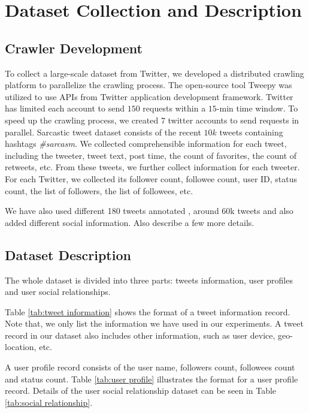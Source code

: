\section{Dataset Collection and Description}
\label{sec:dataset}
\subsection{Crawler Development}
To collect a large-scale dataset from Twitter, we developed a distributed crawling platform to parallelize the crawling process. The open-source tool Tweepy was utilized to use APIs from Twitter application development framework. Twitter has limited each account to send $150$ requests within a $15$-min time window. To speed up the crawling process, we created $7$ twitter accounts to send requests in parallel. Sarcastic tweet dataset consists of the recent $10k$ tweets containing hashtags \emph{\#sarcasm}. We collected comprehensible information for each tweet, including the tweeter, tweet text, post time, the count of favorites, the count of retweets, etc. From these tweets, we further collect information for each tweeter. For each Twitter, we collected its follower count, followee count, user ID, status count, the list of followers, the list of followees, etc.

We have also used different 180 tweets annotated \cite{davidov10}, around 60k tweets \cite{tomas14} and also added different social information. Also describe a few more details.\\

\subsection{Dataset Description}
The whole dataset is divided into three parts: tweets information, user profiles and user social relationships.

Table \ref{tab:tweet information} shows the format of a tweet information record. Note that, we only list the information we have used in our experiments. A tweet record in our dataset also includes other information, such as user device, geo-location, etc. 

A user profile record consists of the user name, followers count, followees count and status count. Table \ref{tab:user profile} illustrates the format for a user profile record. Details of the user social relationship dataset can be seen in Table \ref{tab:social relationship}.

